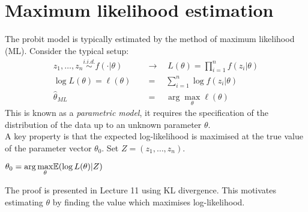 \documentclass[DIV=14,titlepage=false]{scrreprt}
\begin{document}
\section{Maximum likelihood estimation}
The probit model is typically estimated by the method of maximum likelihood (ML). Consider the typical setup:
\begin{align*}
    z_1,\dots, z_n \overset{i.i.d.}{\sim} f(\cdot|\theta) \quad & \rightarrow \quad L(\theta) = \prod_{i=1}^{n}f(z_i|\theta)\\
    \log L(\theta) = \ell(\theta)  \quad &=  \quad \sum_{i=1}^{n}\log f(z_i|\theta)\\
    \hat\theta_{ML  \quad} &=  \quad \arg \underset{\theta}{\max}\ell(\theta)
\end{align*}
This is known as a \textit{parametric model}, it requires the specification of the distribution of the data up to an unknown parameter $\theta$.\\
A key property is that the expected log-likelihood is maximised at the true value of the parameter vector $\theta_0$. Set $Z= (z_1,\dots,z_n)$.
\begin{theorem}
    $\theta_0 = \arg \underset{\theta}{\max} \mathbb{E}(\log L (\theta)|Z)$
\end{theorem}
The proof is presented in Lecture 11 using KL divergence. This motivates estimating $\theta$ by finding the value which maximises log-likelihood.
\end{document}
